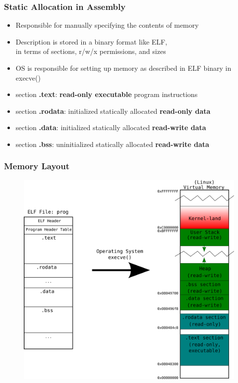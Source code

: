 \documentclass[11pt,xcolor=dvipsnames]{beamer}
\newcommand{\vs}{\vspace{0.5em}}
\newcommand{\mvs}{\vspace{-0.95em}}
\begin{document}
\begin{frame}[fragile,t]
\frametitle{Static Allocation in Assembly}
\begin{itemize}
  \item Responsible for manually specifying the contents of memory
  \item Description is stored in a binary format like ELF, \\ in terms of sections, r/w/x permissions, and sizes
  \item OS is responsible for setting up memory as described in ELF binary in {\ttfamily execve()}
  \pause
  \vs\vs\vs
  \item {\ttfamily section \textbf{.text}}: \textbf{read-only executable} program instructions
  \item {\ttfamily section \textbf{.rodata}}: initialized statically allocated \textbf{read-only data}
  \item {\ttfamily section \textbf{.data}}: initialized statically allocated \textbf{read-write data}
  \item {\ttfamily section \textbf{.bss}}: uninitialized statically allocated \textbf{read-write data}
\end{itemize}
\end{frame}

\begin{frame}[fragile,t]
\frametitle{Memory Layout}
\mvs
\begin{figure}
\centering
\includegraphics[height=0.75\paperheight]{figures/memlayout.png}
\end{figure}
\end{frame}
\end{document}
